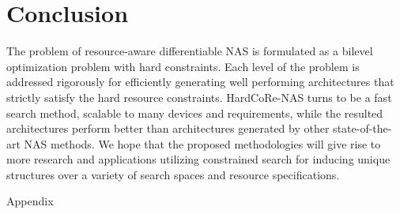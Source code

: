 \documentclass[dvipsnames,table,xcdraw]{article}
\begin{document}
 \section{Conclusion} \label{Conclusion}
The problem of resource-aware differentiable NAS is formulated as a bilevel optimization problem with hard constraints. Each level of the problem is addressed rigorously for efficiently generating well performing architectures that strictly satisfy the hard resource constraints. HardCoRe-NAS turns to be a fast search method, scalable to many devices and requirements, while the resulted architectures perform better than architectures generated by other state-of-the-art NAS methods. We hope that the proposed methodologies will give rise to more research and applications utilizing constrained search for inducing unique structures over a variety of search spaces and resource specifications. 


\newpage
\begin{center}
    \huge
    Appendix
\end{center}
\appendix
\end{document}
